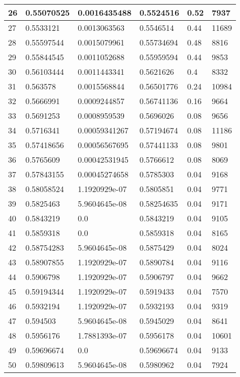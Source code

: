 \begin{longtable}{|l|l|l|l|l|l|}
26 & 0.55070525 & 0.0016435488 & 0.5524516 & 0.52 & 7937 \\ \hline 
27 & 0.5533121 & 0.0013063563 & 0.5546514 & 0.44 & 11689 \\ \hline 
28 & 0.55597544 & 0.0015079961 & 0.55734694 & 0.48 & 8816 \\ \hline 
29 & 0.55844545 & 0.0011052688 & 0.55959594 & 0.44 & 9853 \\ \hline 
30 & 0.56103444 & 0.0011443341 & 0.5621626 & 0.4 & 8332 \\ \hline 
31 & 0.563578 & 0.0015568844 & 0.56501776 & 0.24 & 10984 \\ \hline 
32 & 0.5666991 & 0.0009244857 & 0.56741136 & 0.16 & 9664 \\ \hline 
33 & 0.5691253 & 0.0008959539 & 0.5696026 & 0.08 & 9656 \\ \hline 
34 & 0.5716341 & 0.00059341267 & 0.57194674 & 0.08 & 11186 \\ \hline 
35 & 0.57418656 & 0.00056567695 & 0.57441133 & 0.08 & 9801 \\ \hline 
36 & 0.5765609 & 0.00042531945 & 0.5766612 & 0.08 & 8069 \\ \hline 
37 & 0.57843155 & 0.00045274658 & 0.5785303 & 0.04 & 9168 \\ \hline 
38 & 0.58058524 & 1.1920929e-07 & 0.5805851 & 0.04 & 9771 \\ \hline 
39 & 0.5825463 & 5.9604645e-08 & 0.58254635 & 0.04 & 9171 \\ \hline 
40 & 0.5843219 & 0.0 & 0.5843219 & 0.04 & 9105 \\ \hline 
41 & 0.5859318 & 0.0 & 0.5859318 & 0.04 & 8165 \\ \hline 
42 & 0.58754283 & 5.9604645e-08 & 0.5875429 & 0.04 & 8024 \\ \hline 
43 & 0.58907855 & 1.1920929e-07 & 0.5890784 & 0.04 & 9116 \\ \hline 
44 & 0.5906798 & 1.1920929e-07 & 0.5906797 & 0.04 & 9662 \\ \hline 
45 & 0.59194344 & 1.1920929e-07 & 0.5919433 & 0.04 & 7570 \\ \hline 
46 & 0.5932194 & 1.1920929e-07 & 0.5932193 & 0.04 & 9319 \\ \hline 
47 & 0.594503 & 5.9604645e-08 & 0.5945029 & 0.04 & 8641 \\ \hline 
48 & 0.5956176 & 1.7881393e-07 & 0.5956178 & 0.04 & 10601 \\ \hline 
49 & 0.59696674 & 0.0 & 0.59696674 & 0.04 & 9133 \\ \hline 
50 & 0.59809613 & 5.9604645e-08 & 0.5980962 & 0.04 & 7924 \\ \hline 

\end{longtable}
